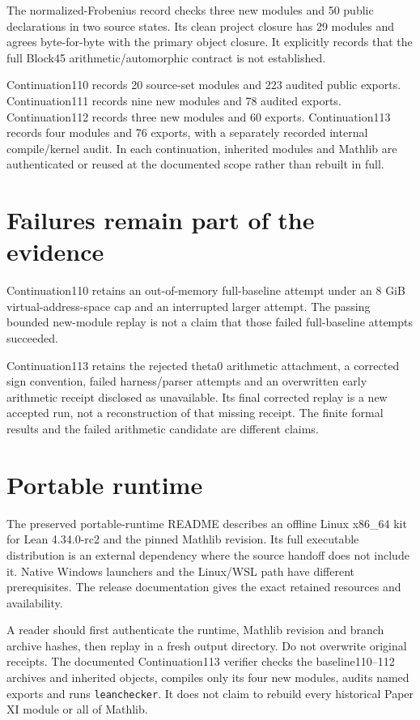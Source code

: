 \documentclass[10pt,oneside]{book}
\begin{document}
The normalized-Frobenius record checks three new modules and 50 public declarations in two source states. Its clean project closure has 29 modules and agrees byte-for-byte with the primary object closure. It explicitly records that the full Block45 arithmetic/automorphic contract is not established.

Continuation110 records 20 source-set modules and 223 audited public exports. Continuation111 records nine new modules and 78 audited exports. Continuation112 records three new modules and 60 exports. Continuation113 records four modules and 76 exports, with a separately recorded internal compile/kernel audit. In each continuation, inherited modules and Mathlib are authenticated or reused at the documented scope rather than rebuilt in full.

\section{Failures remain part of the evidence}
Continuation110 retains an out-of-memory full-baseline attempt under an 8 GiB virtual-address-space cap and an interrupted larger attempt. The passing bounded new-module replay is not a claim that those failed full-baseline attempts succeeded.

Continuation113 retains the rejected theta0 arithmetic attachment, a corrected sign convention, failed harness/parser attempts and an overwritten early arithmetic receipt disclosed as unavailable. Its final corrected replay is a new accepted run, not a reconstruction of that missing receipt. The finite formal results and the failed arithmetic candidate are different claims.

\section{Portable runtime}
The preserved portable-runtime README describes an offline Linux x86\_64 kit for Lean 4.34.0-rc2 and the pinned Mathlib revision. Its full executable distribution is an external dependency where the source handoff does not include it. Native Windows launchers and the Linux/WSL path have different prerequisites. The release documentation gives the exact retained resources and availability.

A reader should first authenticate the runtime, Mathlib revision and branch archive hashes, then replay in a fresh output directory. Do not overwrite original receipts. The documented Continuation113 verifier checks the baseline110--112 archives and inherited objects, compiles only its four new modules, audits named exports and runs \texttt{leanchecker}. It does not claim to rebuild every historical Paper XI module or all of Mathlib.
\end{document}
